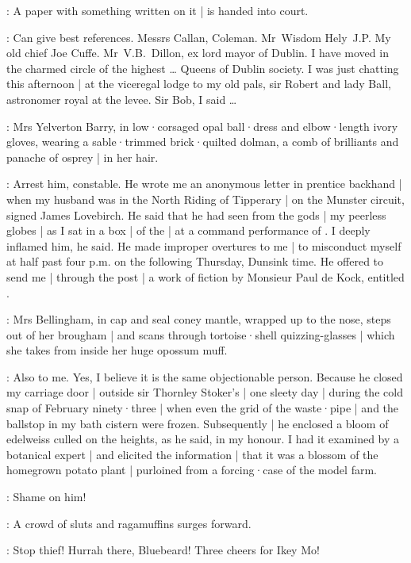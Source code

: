 :
A paper with something written on it |
is handed into court.

\Bloom:
Can give best references.
Messrs Callan,
Coleman.
Mr~Wisdom Hely~J.P.
My old chief Joe Cuffe.
Mr~V.B.~Dillon,
ex lord mayor of Dublin.
I have moved in the charmed circle of the highest \ldots
Queens of Dublin society.
I was just chatting this afternoon |
at the viceregal lodge to my old pals,
sir Robert and lady Ball,
astronomer royal at the levee.
Sir Bob,
I said \ldots

:
Mrs Yelverton Barry,
in low·corsaged opal ball·dress and elbow·length ivory gloves,
wearing a sable·trimmed brick·quilted dolman,
a comb of brilliants and panache of osprey |
in her hair.

\Yelverton:
Arrest him,
constable.
He wrote me an anonymous letter in prentice backhand |
when my husband was in the North Riding of Tipperary |
on the Munster circuit,
signed James Lovebirch.
He said that he had seen from the gods |
my peerless globes |
as I sat in a box |
of the  |
at a command performance of .
I deeply inflamed him,
he said.
He made improper overtures to me |
to misconduct myself at half past four p.m.
on the following Thursday,
Dunsink time.
He offered to send me |
through the post |
a work of fiction by Monsieur Paul de Kock,
entitled .

:
Mrs Bellingham,
in cap and seal coney mantle,
wrapped up to the nose,
steps out of her brougham |
and scans through tortoise·shell quizzing-glasses |
which she takes from inside her huge opossum muff.

\Bellingham:
Also to me.
Yes,
I believe it is the same objectionable person.
Because he closed my carriage door |
outside sir Thornley Stoker's |
one sleety day |
during the cold snap of February ninety·three |
when even the grid of the waste·pipe |
and the ballstop in my bath cistern were frozen.
Subsequently |
he enclosed a bloom of edelweiss culled on the heights,
as he said,
in my honour.
I had it examined by a botanical expert |
and elicited the information |
that it was a blossom of the homegrown potato plant |
purloined from a forcing·case of the model farm.

\Yelverton:
Shame on him!

:
A crowd of sluts and ragamuffins surges forward.

\Ragamuffins:
Stop thief!
Hurrah there,
Bluebeard!
Three cheers for Ikey Mo!

